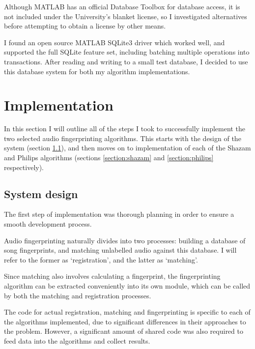 \documentclass[12pt,a4paper,twoside,openright]{report}
\begin{document}
Although MATLAB has an official Database Toolbox for database access, it is not included under the University's blanket license, so I investigated alternatives before attempting to obtain a license by other means.

I found an open source MATLAB SQLite3 driver \cite{Yamaguchi14} which worked well, and supported the full SQLite feature set, including batching multiple operations into transactions. After reading and writing to a small test database, I decided to use this database system for both my algorithm implementations.





\chapter{Implementation}

In this section I will outline all of the steps I took to successfully implement the two selected audio fingerprinting algorithms. This starts with the design of the system (section \ref{section:systemdesign}), and then moves on to implementation of each of the Shazam and Philips algorithms (sections \ref{section:shazam} and \ref{section:philips} respectively).


\section{System design}
\label{section:systemdesign}

The first step of implementation was thorough planning in order to ensure a smooth development process. 

Audio fingerprinting naturally divides into two processes: building a database of song fingerprints, and matching unlabelled audio against this database. I will refer to the former as `registration', and the latter as `matching'.

Since matching also involves calculating a fingerprint, the fingerprinting algorithm can be extracted conveniently into its own module, which can be called by both the matching and registration processes.

The code for actual registration, matching and fingerprinting is specific to each of the algorithms implemented, due to significant differences in their approaches to the problem. However, a significant amount of shared code was also required to feed data into the algorithms and collect results.
\end{document}
